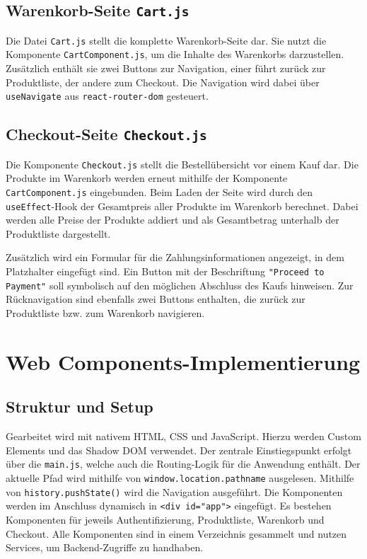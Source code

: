 \documentclass[oneside]{ausarbeitung}
\begin{document}
\subsection{Warenkorb-Seite \texttt{Cart.js}} 

Die Datei \texttt{Cart.js} stellt die komplette Warenkorb-Seite dar.
Sie nutzt die Komponente \texttt{CartComponent.js}, um die Inhalte des Warenkorbs darzustellen. Zusätzlich enthält sie zwei Buttons zur Navigation, einer führt zurück zur Produktliste, der andere zum Checkout. Die Navigation wird dabei über \texttt{useNavigate} aus \texttt{react-router-dom} gesteuert.

\subsection{Checkout-Seite \texttt{Checkout.js}}

Die Komponente \texttt{Checkout.js} stellt die Bestellübersicht vor einem Kauf dar.
Die Produkte im Warenkorb werden erneut mithilfe der Komponente \texttt{CartComponent.js} eingebunden. Beim Laden der Seite wird durch den \texttt{useEffect}-Hook der Gesamtpreis aller Produkte im Warenkorb berechnet. Dabei werden alle Preise der Produkte addiert und als Gesamtbetrag unterhalb der Produktliste dargestellt.

Zusätzlich wird ein Formular für die Zahlungsinformationen angezeigt, in dem Platzhalter eingefügt sind. Ein Button mit der Beschriftung \texttt{"Proceed to Payment"} soll symbolisch auf den möglichen Abschluss des Kaufs hinweisen.
Zur Rücknavigation sind ebenfalls zwei Buttons enthalten, die zurück zur Produktliste bzw. zum Warenkorb navigieren.

\section{Web Components-Implementierung}

\subsection{Struktur und Setup}

Gearbeitet wird mit nativem \ac{HTML}, \ac{CSS} und JavaScript. Hierzu werden Custom Elements und das Shadow DOM verwendet. Der zentrale Einstiegspunkt erfolgt über die \texttt{main.js}, welche auch die Routing-Logik für die Anwendung enthält. Der aktuelle Pfad wird mithilfe von \texttt{window.location.pathname} ausgelesen. Mithilfe von \texttt{history.pushState()} wird die Navigation ausgeführt. Die Komponenten werden im Anschluss dynamisch in \texttt{<div id="app">} eingefügt. Es bestehen Komponenten für jeweils Authentifizierung, Produktliste, Warenkorb und Checkout. Alle Komponenten sind in einem Verzeichnis gesammelt und nutzen Services, um Backend-Zugriffe zu handhaben.
\end{document}
